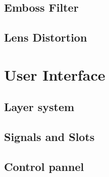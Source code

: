 \subsection{Emboss Filter}
\subsection{Lens Distortion}

\section{User Interface}

\subsection{Layer system}

\subsection{Signals and Slots}

\subsection{Control pannel}












